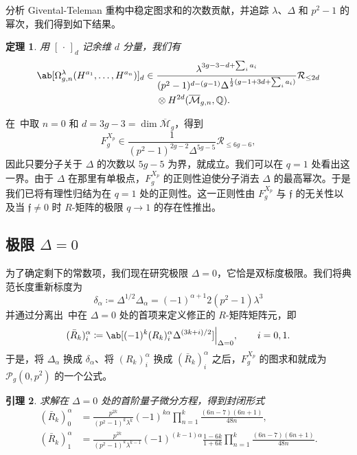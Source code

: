 \documentclass{amsart}
\newtheorem{thm}{定理}[section]
\newtheorem{lem}[thm]{引理}
\theoremstyle{definition}
\theoremstyle{remark}
\theoremstyle{plain}
\theoremstyle{definition}
\theoremstyle{remark}
\newcommand{\Q}{\mathbb{Q}}
\newcommand{\Mbar}{\overline{\mathcal{M}}}
\newcommand{\mc}[1]{\mathcal{#1}}
\newcommand{\mf}[1]{\mathfrak{#1}}
\newcommand{\1}{\mathbf{1}}
\newcommand{\2}{\mathbf{2}}
\newcommand{\3}{\mathbf{3}}
\begin{document}
分析 Givental-Teleman 重构中稳定图求和的次数贡献，并追踪 \(\lambda\)、\(\Delta\) 和 \(p^2-1\) 的幂次，我们得到如下结果。

\begin{thm}%
\label{thm:local P1 reconstruction}
    用 \([\,\cdot\,]_d\) 记余维 \(d\) 分量，我们有
    \begin{align*}
        \ab[\Omega^{\lambda}_{g,n}(H^{a_1},\ldots,H^{a_n})]_d \in{}& \frac{\lambda^{3g-3-d+\sum_i a_i}}{(p^2-1)^{d-(g-1)}\Delta^{\frac{1}{2}(g-1+3d+\sum_i a_i)}}\mc{R}_{\leq 2d} \\
        &\otimes H^{2d}(\Mbar_{g,n},\Q).
    \end{align*}
\end{thm}

在~中取 \(n=0\) 和 \(d = 3g-3 = \dim \Mbar_g\)，得到
\[ F_g^{X_p} \in \frac{1}{(p^2-1)^{2g-2}\Delta^{5g-5}}\mc{R}_{\leq 6g-6}, \]
因此只要分子关于 \(\Delta\) 的次数以 \(5g-5\) 为界，就成立。我们可以在 \(q=1\) 处看出这一界。由于 \(\Delta\) 在那里有单极点，\(F_g^{X_p}\) 的正则性迫使分子消去 \(\Delta\) 的最高幂次。于是我们已将有理性归结为在 \(q=1\) 处的正则性。这一正则性由 \(F_g^{X_p}\) 与 \(\mf{f}\) 的无关性以及当 \(\mf{f} \neq 0\) 时 \(R\)-矩阵的极限 \(q \to 1\) 的存在性推出。

\subsection{极限 \(\Delta = 0\)}%
\label{sub:The limit Delta = 0}

为了确定剩下的常数项，我们现在研究极限 \(\Delta = 0\)，它恰是双标度极限。我们将典范长度重新标度为
\[ \delta_{\alpha} \coloneqq \Delta^{1/2}\Delta_{\alpha} = (-1)^{\alpha+1}2(p^2-1)\lambda^3 \]
并通过分离出~中在 \(\Delta = 0\) 处的首项来定义修正的 \(R\)-矩阵矩阵元，即
\[ (\bar{R}_k)_i^{\alpha} \coloneqq \ab[(-1)^k (R_k)_i^{\alpha}\Delta^{(3k+i)/2}]\Big|_{\Delta=0}, \qquad i = 0,1. \]
于是，将 \(\Delta_{\alpha}\) 换成 \(\delta_{\alpha}\)、将 \((R_k)_i^{\alpha}\) 换成 \((\bar{R}_k)_i^{\alpha}\) 之后，\(F_g^{X_p}\) 的图求和就成为 \(\mc{P}_g(0,p^2)\) 的一个公式。

\begin{lem}%
\label{lem:R matrix at Delta zero}
    求解在 \(\Delta = 0\) 处的首阶量子微分方程，得到封闭形式
    \begin{align*}
        (\bar{R}_k)_0^{\alpha} &= \frac{p^{2k}}{(p^2-1)^k\lambda^k}(-1)^{k\alpha}\prod_{n=1}^k \frac{(6n-7)(6n+1)}{48n}, \\
        (\bar{R}_k)_1^{\alpha} &= \frac{p^{2k}}{(p^2-1)^k \lambda^{k-1}}(-1)^{(k-1)\alpha}\frac{1-6k}{1+6k}\prod_{n=1}^k \frac{(6n-7)(6n+1)}{48n}.
    \end{align*}
\end{lem}
\end{document}
